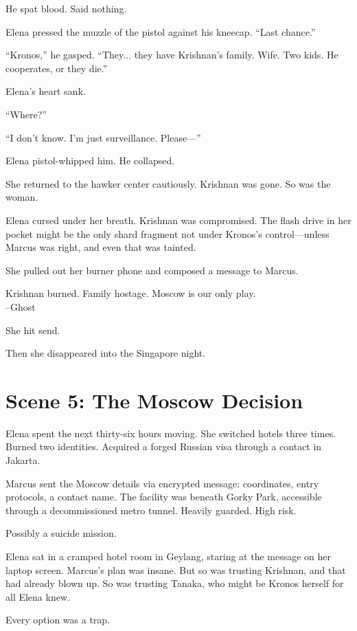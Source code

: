 \documentclass[12pt,oneside]{book}
\begin{document}
He spat blood. Said nothing.

Elena pressed the muzzle of the pistol against his kneecap. ``Last chance.''

``Kronos,'' he gasped. ``They... they have Krishnan's family. Wife. Two kids. He cooperates, or they die.''

Elena's heart sank.

``Where?''

``I don't know. I'm just surveillance. Please—''

Elena pistol-whipped him. He collapsed.

She returned to the hawker center cautiously. Krishnan was gone. So was the woman.

Elena cursed under her breath. Krishnan was compromised. The flash drive in her pocket might be the only shard fragment not under Kronos's control—unless Marcus was right, and even that was tainted.

She pulled out her burner phone and composed a message to Marcus.

\begin{terminalbox}
Krishnan burned. Family hostage. Moscow is our only play.\\
--Ghost
\end{terminalbox}

She hit send.

Then she disappeared into the Singapore night.

\section*{Scene 5: The Moscow Decision}

Elena spent the next thirty-six hours moving. She switched hotels three times. Burned two identities. Acquired a forged Russian visa through a contact in Jakarta.

Marcus sent the Moscow details via encrypted message: coordinates, entry protocols, a contact name. The facility was beneath Gorky Park, accessible through a decommissioned metro tunnel. Heavily guarded. High risk.

Possibly a suicide mission.

Elena sat in a cramped hotel room in Geylang, staring at the message on her laptop screen. Marcus's plan was insane. But so was trusting Krishnan, and that had already blown up. So was trusting Tanaka, who might be Kronos herself for all Elena knew.

Every option was a trap.
\end{document}
